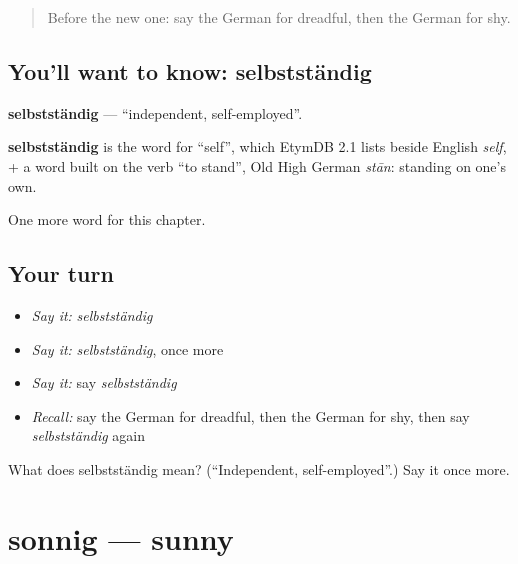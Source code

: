 \label{lesson:GE-C221-selbststaendig}



\begin{quote}
Before the new one: say the German for dreadful, then the German for shy.
\end{quote}

\subsection*{You'll want to know: selbstständig}
\textbf{selbstständig} — \textquotedblleft{}independent, self-employed\textquotedblright{}.

\begin{cousinweb}
\textbf{selbstständig} is the word for \textquotedblleft{}self\textquotedblright{}, which EtymDB 2.1 lists beside English \emph{self}, + a word built on the verb \textquotedblleft{}to stand\textquotedblright{}, Old High German \emph{stān}: standing on one's own.
\end{cousinweb}

\begin{grammarlens}[title={What you've built}]
One more word for this chapter.
\end{grammarlens}

\subsection*{Your turn}
\begin{itemize}
\raggedright
  \item \emph{Say it:} \emph{selbstständig}
  \item \emph{Say it:} \emph{selbstständig}, once more
  \item \emph{Say it:} say \emph{selbstständig}
  \item \emph{Recall:} say the German for dreadful, then the German for shy, then say \emph{selbstständig} again
\end{itemize}

\begin{tcolorbox}[breakable,colback=teal!4,colframe=teal!35!black,title={Before you move on}]
What does selbstständig mean? (\textquotedblleft{}Independent, self-employed\textquotedblright{}.) Say it once more.
\end{tcolorbox}
\section[sonnig]{sonnig — sunny}

